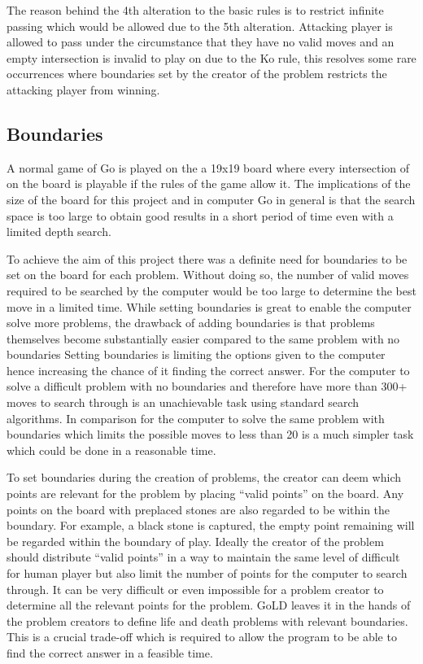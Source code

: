 \documentclass{l4proj}
\begin{document}
\bigskip
The reason behind the 4th alteration to the basic rules is to restrict infinite passing which would be allowed due to the 5th alteration. Attacking player is allowed to pass under the circumstance that they have no valid moves and an empty intersection is invalid to play on due to the Ko rule, this resolves some rare occurrences where boundaries set by the creator of the problem restricts the attacking player from winning.

\subsection{Boundaries}
A normal game of Go is played on the a 19x19 board where every intersection of on the board is playable if the rules of the game allow it. The implications of the size of the board for this project and in computer Go in general is that the search space is too large to obtain good results in a short period of time even with a limited depth search.

To achieve the aim of this project there was a definite need for boundaries to be set on the board for each problem. Without doing so, the number of valid moves required to be searched by the computer would be too large to determine the best move in a limited time. While setting boundaries is great to enable the computer solve more problems, the drawback of adding boundaries is that problems themselves become substantially easier compared to the same problem with no boundaries Setting boundaries is limiting the options given to the computer hence increasing the chance of it finding the correct answer. For the computer to solve a difficult problem with no boundaries and therefore have more than 300+ moves to search through is an unachievable task using standard search algorithms. In comparison for the computer to solve the same problem with boundaries which limits the possible moves to less than 20 is a much simpler task which could be done in a reasonable time.

To set boundaries during the creation of problems, the creator can deem which points are relevant for the problem by placing “valid points” on the board. Any points on the board with preplaced stones are also regarded to be within the boundary. For example, a black stone is captured, the empty point remaining will be regarded within the boundary of play. Ideally the creator of the problem should distribute “valid points” in a way to maintain the same level of difficult for human player but also limit the number of points for the computer to search through. It can be very difficult or even impossible for a problem creator to determine all the relevant points for the problem. GoLD leaves it in the hands of the problem creators to define life and death problems with relevant boundaries. This is a crucial trade-off which is required to allow the program to be able to find the correct answer in a feasible time.
\end{document}
